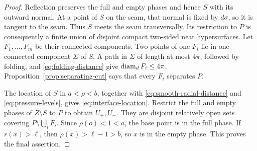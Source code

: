 \begin{proof}
Reflection preserves the full and empty phases and hence $S$ with its
outward normal.  At a point of $S$ on the seam, that normal is fixed by
$d\sigma$, so it is tangent
to the seam.  Thus $S$ meets the seam transversally.  Its restriction
to $P$ is consequently a finite union of disjoint compact two-sided
neat hypersurfaces.  Let $F_1,\ldots,F_m$ be their connected components.
Two points of one $F_i$ lie in one connected component $\Sigma$ of
$S$.  A path in $\Sigma$ of length at most $4\pi$, followed by folding,
and \eqref{eq:folding-distance} give $\operatorname{diam}_d F_i\le4\pi$.
Proposition~\ref{prop:separating-cut} says that every $F_i$ separates
$P$.

The location of $S$ in $a<\rho<b$, together with
\eqref{eq:smooth-radial-distance} and \eqref{eq:pressure-levels}, gives
\eqref{eq:interface-location}.  Restrict the full and empty phases of
$Z\setminus S$ to $P$ to obtain $U_+,U_-$.  They are disjoint relatively
open sets covering $P\setminus\bigcup_iF_i$.  Since $\rho(o)<1<a$,
the base point is in the full phase.  If $r(x)>\ell$, then
$\rho(x)>\ell-1>b$, so $x$ is in the empty phase.  This proves the final
assertion.
\end{proof}
